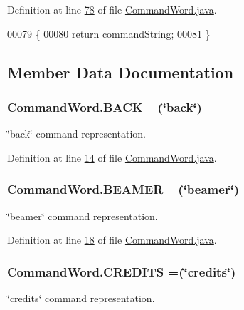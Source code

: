 Definition at line \hyperlink{CommandWord_8java_source_l00078}{78} of file \hyperlink{CommandWord_8java_source}{Command\-Word.\-java}.


\begin{DoxyCode}
00079     \{
00080         \textcolor{keywordflow}{return} commandString;
00081     \}
\end{DoxyCode}


\subsection{Member Data Documentation}
\hypertarget{enumCommandWord_a3309e549607eb8de673c296db55f7517}{
\subsubsection[{B\-A\-C\-K}]{\setlength{\rightskip}{0pt plus 5cm}Command\-Word.\-B\-A\-C\-K =(\char`\"{}back\char`\"{})}}\label{enumCommandWord_a3309e549607eb8de673c296db55f7517}
\char`\"{}back\char`\"{} command representation. 

Definition at line \hyperlink{CommandWord_8java_source_l00014}{14} of file \hyperlink{CommandWord_8java_source}{Command\-Word.\-java}.

\hypertarget{enumCommandWord_ab916560f94837341b38c83aa3cf5497f}{
\subsubsection[{B\-E\-A\-M\-E\-R}]{\setlength{\rightskip}{0pt plus 5cm}Command\-Word.\-B\-E\-A\-M\-E\-R =(\char`\"{}beamer\char`\"{})}}\label{enumCommandWord_ab916560f94837341b38c83aa3cf5497f}
\char`\"{}beamer\char`\"{} command representation. 

Definition at line \hyperlink{CommandWord_8java_source_l00018}{18} of file \hyperlink{CommandWord_8java_source}{Command\-Word.\-java}.

\hypertarget{enumCommandWord_aff84c19093cea7bf97301062fe61e0a4}{
\subsubsection[{C\-R\-E\-D\-I\-T\-S}]{\setlength{\rightskip}{0pt plus 5cm}Command\-Word.\-C\-R\-E\-D\-I\-T\-S =(\char`\"{}credits\char`\"{})}}\label{enumCommandWord_aff84c19093cea7bf97301062fe61e0a4}
\char`\"{}credits\char`\"{} command representation. 

